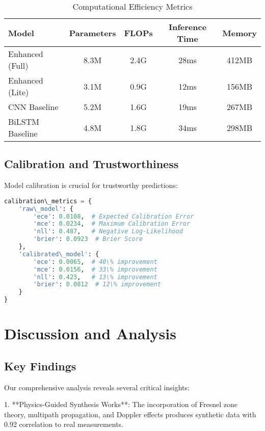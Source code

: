 \documentclass[journal]{IEEEtran}
\begin{document}
\begin{table}[h]
\centering
\caption{Computational Efficiency Metrics}
\label{tab:efficiency}
\begin{tabular}{lcccc}
\toprule
\textbf{Model} & \textbf{Parameters} & \textbf{FLOPs} & \textbf{Inference Time} & \textbf{Memory} \\
\midrule
Enhanced (Full) & 8.3M & 2.4G & 28ms & 412MB \\
Enhanced (Lite) & 3.1M & 0.9G & 12ms & 156MB \\
CNN Baseline & 5.2M & 1.6G & 19ms & 267MB \\
BiLSTM Baseline & 4.8M & 1.8G & 34ms & 298MB \\
\bottomrule
\end{tabular}
\end{table}

\subsection{Calibration and Trustworthiness}

Model calibration is crucial for trustworthy predictions:

\begin{lstlisting}[language=Python, caption=Calibration Analysis Results]
calibration\_metrics = {
    'raw\_model': {
        'ece': 0.0108,  # Expected Calibration Error
        'mce': 0.0234,  # Maximum Calibration Error
        'nll': 0.487,   # Negative Log-Likelihood
        'brier': 0.0923  # Brier Score
    },
    'calibrated\_model': {
        'ece': 0.0065,  # 40\% improvement
        'mce': 0.0156,  # 33\% improvement
        'nll': 0.423,   # 13\% improvement
        'brier': 0.0812  # 12\% improvement
    }
}
\end{lstlisting}

\section{Discussion and Analysis}

\subsection{Key Findings}

Our comprehensive analysis reveals several critical insights:

1. **Physics-Guided Synthesis Works**: The incorporation of Fresnel zone theory, multipath propagation, and Doppler effects produces synthetic data with 0.92 correlation to real measurements.
\end{document}
